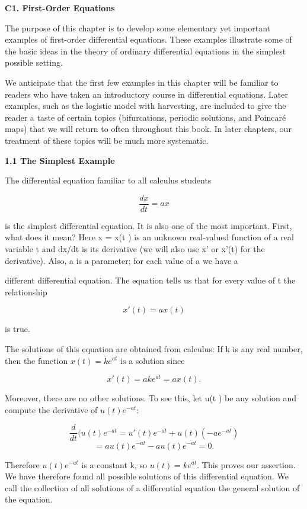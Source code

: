 \documentclass[12pt]{article}
\begin{document}
\textbf{C1. First-Order Equations}

\hfill

The purpose of this chapter is to develop some elementary yet important
examples of first-order differential equations. These examples illustrate some
of the basic ideas in the theory of ordinary differential equations in the simplest
possible setting.

We anticipate that the first few examples in this chapter will be familiar to
readers who have taken an introductory course in differential equations. Later
examples, such as the logistic model with harvesting, are included to give the
reader a taste of certain topics (bifurcations, periodic solutions, and Poincaré
maps) that we will return to often throughout this book. In later chapters, our
treatment of these topics will be much more systematic.

\hfill

\textbf{1.1 The Simplest Example}

\hfill

The differential equation familiar to all calculus students

\[
\frac{dx}{dt} = ax
\]

is the simplest differential equation. It is also one of the most important.
First, what does it mean? Here x = x(t ) is an unknown real-valued function
of a real variable t and dx/dt is its derivative (we will also use x' or x'(t)
for the derivative). Also, a is a parameter; for each value of a we have a

different differential equation. The equation tells us that for every value of t
the relationship

\[
x'(t) = ax(t)
\]

is true.

The solutions of this equation are obtained from calculus: If k is any real
number, then the function $x(t) = ke^{at}$ is a solution since

\[
x'(t) = ake^{at} = ax(t).
\]

Moreover, there are no other solutions. To see this, let u(t ) be any solution and
compute the derivative of $u(t)e^{-at}$:

\[
\frac{d}{dt} (u(t)e^{-at} = u'(t)e^{-at} + u(t)(-ae^{-at})
\]
\[
= au(t)e^{-at} - au(t)e^{-at} = 0.
\]

Therefore $u(t)e^{-at}$ is a constant k, so $u(t) = ke^{at}$. This proves our assertion.
We have therefore found all possible solutions of this differential equation. We
call the collection of all solutions of a differential equation the general solution
of the equation.
\end{document}
